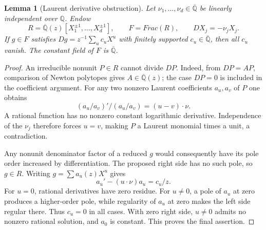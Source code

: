 \documentclass[11pt,a4paper]{article}
\newtheorem{lemma}[theorem]{Lemma}
\theoremstyle{definition}
\theoremstyle{remark}
\theoremstyle{plain}
\numberwithin{equation}{section}
\def\operatorname#1{#1}\def\mathrm#1{#1}}
\begin{document}
\begin{lemma}[Laurent derivative obstruction]\label{sc:dep:laurent}
Let $\nu_1,\ldots,\nu_d\in\overline{\mathbb Q}$ be linearly
independent over $\mathbb Q$. Endow
\[
 R=\overline{\mathbb Q}(z)[X_1^{\pm1},\ldots,X_d^{\pm1}],
 \qquad F=\operatorname{Frac}(R),\qquad DX_j=-\nu_jX_j.
\]
If $g\in F$ satisfies
$Dg=z^{-1}\sum_u c_uX^u$ with finitely supported
$c_u\in\overline{\mathbb Q}$, then all $c_u$ vanish.
The constant field of $F$ is $\overline{\mathbb Q}$.
\end{lemma}
\begin{proof}
An irreducible nonunit $P\in R$ cannot divide $DP$. Indeed, from
$DP=AP$, comparison of Newton polytopes gives
$A\in\overline{\mathbb Q}(z)$; the case $DP=0$ is included in the
coefficient argument. For any two nonzero Laurent coefficients
$a_u,a_v$ of $P$ one obtains
\[
 (a_u/a_v)'/(a_u/a_v)=(u-v)\cdot\nu.
\]
A rational function has no nonzero constant logarithmic derivative.
Independence of the $\nu_j$ therefore forces $u=v$, making $P$ a
Laurent monomial times a unit, a contradiction.

Any nonunit denominator factor of a reduced $g$ would consequently
have its pole order increased by differentiation. The proposed right
side has no such pole, so $g\in R$. Writing $g=\sum a_u(z)X^u$ gives
\[
 a_u'-(u\cdot\nu)a_u=c_u/z.
\]
For $u=0$, rational derivatives have zero residue. For $u\ne0$, a pole
of $a_u$ at zero produces a higher-order pole, while regularity of
$a_u$ at zero makes the left side regular there. Thus $c_u=0$ in all
cases. With zero right side, $u\ne0$ admits no nonzero rational
solution, and $a_0$ is constant. This proves the final assertion.
\end{proof}
\end{document}
